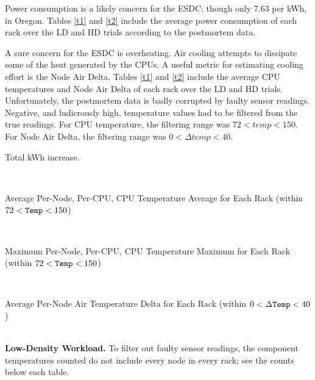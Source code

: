 Power consumption is a likely concern for the ESDC; though only 7.63\textcent{} per kWh, in Oregon. Tables \ref{t1} and \ref{t2} include the average power consumption of each rack over the LD and HD trials according to the postmortem data. %


A sure concern for the ESDC is overheating.
Air cooling attempts to dissipate some of the heat generated by the CPUs. A useful metric for estimating cooling effort is the Node Air Delta.
Tables \ref{t1} and \ref{t2} include the average CPU temperatures and Node Air Delta of each rack over the LD and HD trials. Unfortunately, the postmortem data is badly corrupted by faulty sensor readings.
Negative, and ludicrously high, temperature values had to be filtered from the true readings. For CPU temperature, the filtering range was $72<temp<150$.
For Node Air Delta, the filtering range was $0<\Delta temp<40$.

\begin{table}[!h]
  \centering
   \centerline{Total kWh increase.}
   \\
   \vspace{1cm}
   \centerline{Average Per-Node, Per-CPU, CPU Temperature Average for Each Rack (within $72<{\tt Temp}<150$)}
   \\
   \vspace{1cm}
   \centerline{Maximum Per-Node, Per-CPU, CPU Temperature Maximum for Each Rack (within $72<{\tt Temp}<150$)}
   \\
   \vspace{1cm}
   \centerline{Average Per-Node Air Temperature Delta for Each Rack (within $0<\Delta{\tt Temp}<40$)}
   \\
   \caption{{\bf Low-Density Workload.} To filter out faulty sensor readings, the component temperatures counted do not include every node in every rack; see the counts below each table.\label{t1}}
\end{table}

